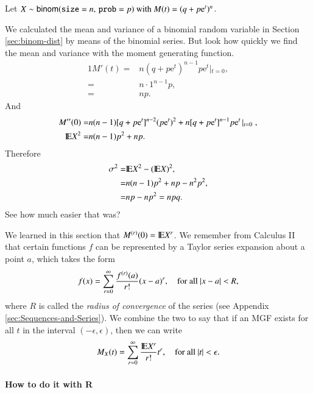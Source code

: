 \documentclass[captions=tableheading]{scrbook}
\begin{document}
\begin{example}
Let \(X\sim\mathsf{binom}(\mathtt{size}=n,\,\mathtt{prob}=p)\mbox{ with \ensuremath{M(t)=(q+p\mathrm{e}^{t})^{n}}}\).

We calculated the mean and variance of a binomial random variable in Section \ref{sec:binom-dist} by means of the binomial series. But look how quickly we find the mean and variance with the moment generating function.
\begin{alignat*}{1}
M'(t)= & n(q+p\mathrm{e}^{t})^{n-1}p\mathrm{e}^{t}\left|_{t=0}\right.,\\
= & n\cdot1^{n-1}p,\\
= & np.
\end{alignat*}
And
\begin{alignat*}{1}
M''(0)= & n(n-1)[q+p\mathrm{e}^{t}]^{n-2}(p\mathrm{e}^{t})^{2}+n[q+p\mathrm{e}^{t}]^{n-1}p\mathrm{e}^{t}\left|_{t=0}\right.,\\
\mathrm{I\hspace{-1.5pt}E} X^{2}= & n(n-1)p^{2}+np.
\end{alignat*}
Therefore
\begin{alignat*}{1}
\sigma^{2}= & \mathrm{I\hspace{-1.5pt}E} X^{2}-(\mathrm{I\hspace{-1.5pt}E} X)^{2},\\
= & n(n-1)p^{2}+np-n^{2}p^{2},\\
= & np-np^{2}=npq.
\end{alignat*}
See how much easier that was?
\end{example}

\begin{rem}
We learned in this section that \(M^{(r)}(0)=\mathrm{I\hspace{-1.5pt}E} X^{r}\). We remember from Calculus II that certain functions \(f\) can be represented by a Taylor series expansion about a point \(a\), which takes the form
\begin{equation}
f(x)=\sum_{r=0}^{\infty}\frac{f^{(r)}(a)}{r!}(x-a)^{r},\quad\mbox{for all \ensuremath{|x-a|<R},}
\end{equation}
where \(R\) is called the \emph{radius of convergence} of the series (see Appendix \ref{sec:Sequences-and-Series}). We combine the two to say that if an MGF exists for all \(t\) in the interval \((-\epsilon,\epsilon)\), then we can write
\begin{equation}
M_{X}(t)=\sum_{r=0}^{\infty}\frac{\mathrm{I\hspace{-1.5pt}E} X^{r}}{r!}t^{r},\quad\mbox{for all \ensuremath{|t|<\epsilon}.}
\end{equation}
\end{rem}

\paragraph*{How to do it with \textsf{R}}
\end{document}
